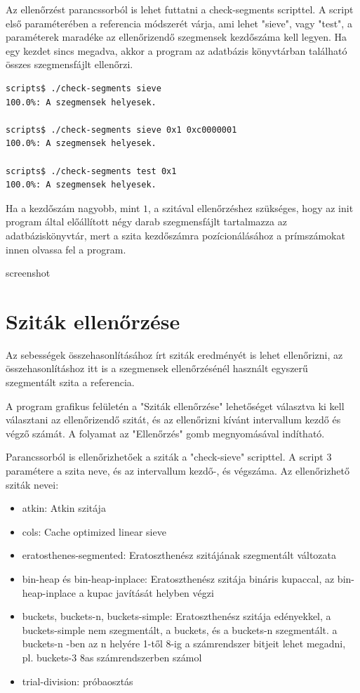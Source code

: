 \documentclass[12pt]{report}
\begin{document}
Az ellenőrzést parancssorból is lehet futtatni a check-segments scripttel.
A script első paraméterében a referencia módszerét várja,
ami lehet "sieve", vagy "test", a paraméterek maradéke az ellenőrizendő
szegmensek kezdőszáma kell legyen. Ha egy kezdet sincs megadva, akkor
a program az adatbázis könyvtárban található összes szegmensfájlt ellenőrzi.

{\tiny
\begin{lstlisting}[language=bash]
scripts$ ./check-segments sieve
100.0%: A szegmensek helyesek.             

scripts$ ./check-segments sieve 0x1 0xc0000001
100.0%: A szegmensek helyesek.             

scripts$ ./check-segments test 0x1
100.0%: A szegmensek helyesek.             

\end{lstlisting}
}

Ha a kezdőszám nagyobb, mint $1$, a szitával ellenőrzéshez szükséges,
hogy az init program által előállított négy darab szegmensfájlt tartalmazza
az adatbáziskönyvtár, mert a szita kezdőszámra pozícionálásához a prímszámokat
innen olvassa fel a program.

{\color{red}screenshot}

\section{Sziták ellenőrzése}

Az sebességek összehasonlításához írt sziták eredményét is lehet ellenőrizni,
az összehasonlításhoz itt is a szegmensek ellenőrzésénél használt
egyszerű szegmentált szita a referencia.

A program grafikus felületén a "Sziták ellenőrzése" lehetőséget
választva ki kell választani az ellenőrizendő szitát, és az ellenőrizni
kívánt intervallum kezdő és végző számát.
A folyamat az "Ellenőrzés" gomb megnyomásával indítható.

Parancssorból is ellenőrizhetőek a sziták a "check-sieve" scripttel.
A script 3 paramétere a szita neve, és az intervallum kezdő-, és végszáma.
Az ellenőrizhető sziták nevei:

\begin{itemize}
\item atkin: Atkin szitája
\item cols: Cache optimized linear sieve
\item eratosthenes-segmented: Eratoszthenész szitájának szegmentált változata
\item bin-heap és bin-heap-inplace: Eratoszthenész szitája bináris kupaccal,
	az bin-heap-inplace a kupac javítását helyben végzi
\item buckets, buckets-n, buckets-simple: Eratoszthenész szitája edényekkel,
	a buckets-simple nem szegmentált, a buckets, és a buckets-n szegmentált.
	a buckets-n -ben az n helyére 1-től 8-ig a számrendszer bitjeit lehet megadni,
	pl. buckets-3 8as számrendszerben számol
\item trial-division: próbaosztás
\end{itemize}
\end{document}
